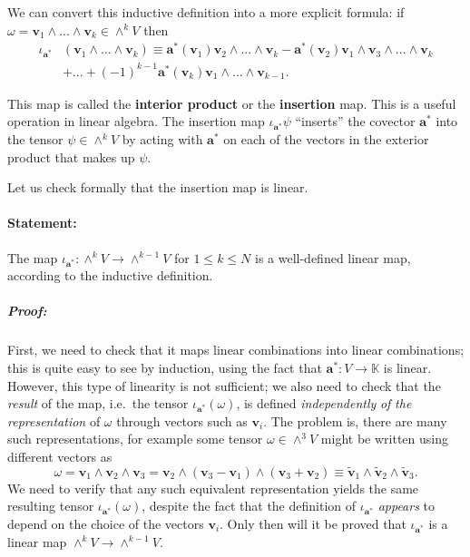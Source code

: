 We can convert this inductive definition into a more explicit formula:
if $\omega=\mathbf{v}_{1}\wedge...\wedge\mathbf{v}_{k}\in\wedge^{k}V$
then \begin{align*}
\iota_{\mathbf{a}^{*}} & (\mathbf{v}_{1}\wedge...\wedge\mathbf{v}_{k})\equiv\mathbf{a}^{*}(\mathbf{v}_{1})\mathbf{v}_{2}\wedge...\wedge\mathbf{v}_{k}-\mathbf{a}^{*}(\mathbf{v}_{2})\mathbf{v}_{1}\wedge\mathbf{v}_{3}\wedge...\wedge\mathbf{v}_{k}\\
 & +...+\left(-1\right)^{k-1}\mathbf{a}^{*}(\mathbf{v}_{k})\mathbf{v}_{1}\wedge...\wedge\mathbf{v}_{k-1}.\end{align*}


This map is called the \textbf{interior product}
or the \textbf{insertion} map. This is a useful
operation in  linear algebra. The insertion map $\iota_{\mathbf{a}^{*}}\psi$
{}``inserts'' the covector $\mathbf{a}^{*}$ into the tensor $\psi\in\wedge^{k}V$
by acting with $\mathbf{a}^{*}$ on each of the vectors in the exterior
product that makes up $\psi$.

Let us check formally that the insertion map is linear. 


\paragraph{Statement:}

The map $\iota_{\mathbf{a}^{*}}:\wedge^{k}V\rightarrow\wedge^{k-1}V$
for $1\leq k\leq N$ is a well-defined linear map, according to the
inductive definition.


\subparagraph{Proof:}

First, we need to check that it maps linear combinations into linear
combinations; this is quite easy to see by induction, using the fact
that $\mathbf{a}^{*}:V\rightarrow\mathbb{K}$ is linear. However,
this type of linearity is not sufficient; we also need to check that
the \emph{result} of the map, i.e.~the tensor $\iota_{\mathbf{a}^{*}}(\omega)$,
is defined \emph{independently} \emph{of} \emph{the} \emph{representation}
of $\omega$ through vectors such as $\mathbf{v}_{i}$. The problem
is, there are many such representations, for example some tensor $\omega\in\wedge^{3}V$
might be written using different vectors as \[
\omega=\mathbf{v}_{1}\wedge\mathbf{v}_{2}\wedge\mathbf{v}_{3}=\mathbf{v}_{2}\wedge(\mathbf{v}_{3}-\mathbf{v}_{1})\wedge(\mathbf{v}_{3}+\mathbf{v}_{2})\equiv\tilde{\mathbf{v}}_{1}\wedge\tilde{\mathbf{v}}_{2}\wedge\tilde{\mathbf{v}}_{3}.\]
 We need to verify that any such equivalent representation yields
the same resulting tensor $\iota_{\mathbf{a}^{*}}(\omega)$, despite
the fact that the definition of $\iota_{\mathbf{a}^{*}}$ \emph{appears}
to depend on the choice of the vectors $\mathbf{v}_{i}$. Only then
will it be proved that $\iota_{\mathbf{a}^{*}}$ is a linear map $\wedge^{k}V\rightarrow\wedge^{k-1}V$.

